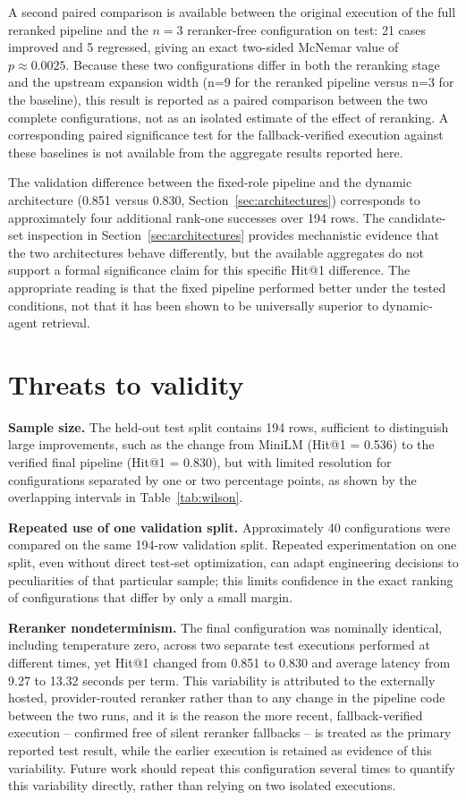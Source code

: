 A second paired comparison is available between the original execution of the full reranked pipeline and the $n=3$ reranker-free configuration on test: 21 cases improved and 5 regressed, giving an exact two-sided McNemar value of $p \approx 0.0025$. Because these two configurations differ in both the reranking stage and the upstream expansion width (n=9 for the reranked pipeline versus n=3 for the baseline), this result is reported as a paired comparison between the two complete configurations, not as an isolated estimate of the effect of reranking. A corresponding paired significance test for the fallback-verified execution against these baselines is not available from the aggregate results reported here.

The validation difference between the fixed-role pipeline and the dynamic architecture (0.851 versus 0.830, Section~\ref{sec:architectures}) corresponds to approximately four additional rank-one successes over 194 rows. The candidate-set inspection in Section~\ref{sec:architectures} provides mechanistic evidence that the two architectures behave differently, but the available aggregates do not support a formal significance claim for this specific Hit@1 difference. The appropriate reading is that the fixed pipeline performed better under the tested conditions, not that it has been shown to be universally superior to dynamic-agent retrieval.

\section{Threats to validity}
\label{sec:threats}

\textbf{Sample size.} The held-out test split contains 194 rows, sufficient to distinguish large improvements, such as the change from MiniLM (Hit@1 = 0.536) to the verified final pipeline (Hit@1 = 0.830), but with limited resolution for configurations separated by one or two percentage points, as shown by the overlapping intervals in Table~\ref{tab:wilson}.

\textbf{Repeated use of one validation split.} Approximately 40 configurations were compared on the same 194-row validation split. Repeated experimentation on one split, even without direct test-set optimization, can adapt engineering decisions to peculiarities of that particular sample; this limits confidence in the exact ranking of configurations that differ by only a small margin.

\textbf{Reranker nondeterminism.} The final configuration was nominally identical, including temperature zero, across two separate test executions performed at different times, yet Hit@1 changed from 0.851 to 0.830 and average latency from 9.27 to 13.32 seconds per term. This variability is attributed to the externally hosted, provider-routed reranker rather than to any change in the pipeline code between the two runs, and it is the reason the more recent, fallback-verified execution -- confirmed free of silent reranker fallbacks -- is treated as the primary reported test result, while the earlier execution is retained as evidence of this variability. Future work should repeat this configuration several times to quantify this variability directly, rather than relying on two isolated executions.

